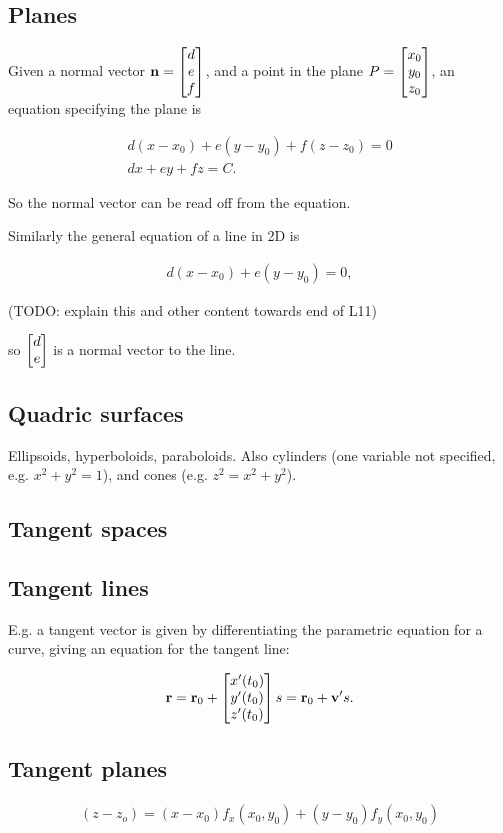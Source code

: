 \subsection*{Planes}
Given a normal vector $\mathbf n = \begin{bmatrix}d\\e\\f\end{bmatrix}$, and a point in the plane
$P = \begin{bmatrix}x_0\\y_0\\z_0\end{bmatrix}$, an equation specifying the plane is

\begin{align*}
  d(x - x_0) + e(y - y_0) + f(z - z_0) = 0 \\
  dx + ey + fz = C.
\end{align*}

So the normal vector can be read off from the equation.

Similarly the general equation of a line in 2D is

\begin{align*}
  d(x - x_0) + e(y - y_0) = 0,
\end{align*}

(TODO: explain this and other content towards end of L11)

so $\begin{bmatrix}d\\e\end{bmatrix}$ is a normal vector to the line.


\subsection*{Quadric surfaces}
Ellipsoids, hyperboloids, paraboloids. Also cylinders (one variable not
specified, e.g. $x^2 + y^2 = 1$), and cones (e.g. $z^2 = x^2 + y^2$).

\subsection{Tangent spaces}

\subsection*{Tangent lines}
E.g. a tangent vector is given by differentiating the parametric equation for a
curve, giving an equation for the tangent line:

\begin{align*}
  \mathbf r = \mathbf r_0 + \begin{bmatrix}x'(t_0)\\y'(t_0)\\z'(t_0)\end{bmatrix}s = \mathbf r_0 + \mathbf v' s.
\end{align*}

\subsection*{Tangent planes}

\begin{align*}
  (z - z_o) = (x - x_0)f_x(x_0, y_0) + (y - y_0)f_y(x_0, y_0)
\end{align*}

